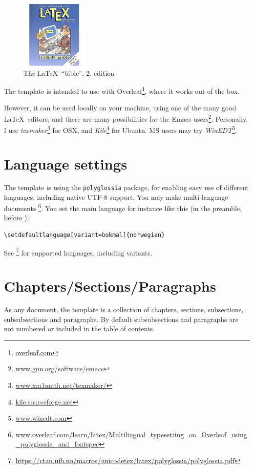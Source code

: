 \begin{figure}[!htbp]
\centering 
    \includegraphics[width=0.3\textwidth]{Graphics/lamport}
    \caption{The \LaTeX\ ``bible'', 2. edition \label{fig:lamport}}
\end{figure}


The template is intended to use with Overleaf\footnote{\url{overleaf.com}}, where it works out of the box.

However, it can be used locally on your machine, using one of the many good \LaTeX\ editors, and there are many possibilities for the Emacs users\footnote{\url{www.gnu.org/software/emacs}}. Personally, I use {\em texmaker}\footnote{\url{www.xm1math.net/texmaker/}}
for OSX, and 
{\em Kile}\footnote{\url{kile.sourceforge.net}}
for Ubuntu. MS users may try {\em WinEDT}\footnote{\url{www.winedt.com}}.


\section{Language settings}

The template is using the \texttt{polyglossia} package, for enabling easy use of different languages, including native UTF-8 support. You may make multi-language documents \footnote{\url{www.overleaf.com/learn/latex/Multilingual_typesetting_on_Overleaf_using_polyglossia_and_fontspec}}. You set the main language for instance like this (in the preamble, before \verb||):

\verb|\setdefaultlanguage[variant=bokmal]{norwegian}|

See \cite[p.~6]{polyglossia}\footnote{\url{https://ctan.uib.no/macros/unicodetex/latex/polyglossia/polyglossia.pdf}} for supported languages, including variants.

\section{Chapters/Sections/Paragraphs}

As any document, the template is a collection of chapters, sections, subsections, subsubsections and paragraphs. By default subsubsections and paragraphs are not numbered or included in the table of contents. 

